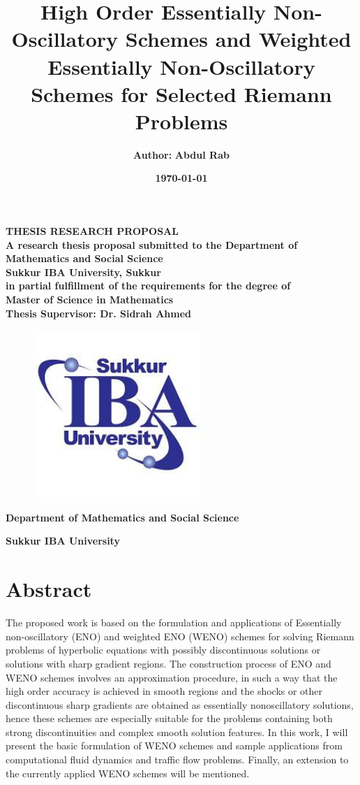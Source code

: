 \documentclass{article}
\title{\textbf{High Order Essentially Non-Oscillatory Schemes and Weighted Essentially Non-Oscillatory Schemes for Selected Riemann Problems}}
\author{\textbf {Author: }\textbf{Abdul Rab}}
\date{\textbf \today}
\begin{document}
\maketitle
\begin{center}
    \textbf{THESIS RESEARCH PROPOSAL \\A research thesis proposal submitted to the Department of\\ Mathematics and Social Science\\Sukkur IBA University, Sukkur\\ \medskip in partial fulfillment of the requirements for the degree of\\Master of Science in Mathematics\\ \medskip Thesis Supervisor: Dr. Sidrah Ahmed}
\end{center} 

\begin{figure}[h]
    \centering
    \includegraphics[height = 2.5in]{IBA.jpg}
    \label{fig:my_label}
\end{figure}
\begin{center}
    \textbf {Department of Mathematics and Social Science}
\end{center}

\begin{center}
    \Huge{\textbf{Sukkur IBA University}}
\end{center}
\newpage

\tableofcontents

\section*{\textbf{Abstract}}
The proposed work is based on the formulation and applications of Essentially
non-oscillatory (ENO) and weighted ENO (WENO) schemes for solving
Riemann problems of hyperbolic equations with possibly discontinuous
solutions or solutions with sharp gradient regions. The construction process of
ENO and WENO schemes \cite{shu_2020} involves an approximation procedure, in such a way
that the high order accuracy is achieved in smooth regions and the shocks or
other discontinuous sharp gradients are obtained as essentially nonoscillatory solutions, hence these schemes are especially suitable for the
problems containing both strong discontinuities and complex smooth solution
features. In this work, I will present the basic formulation of WENO schemes
and sample applications from computational fluid dynamics and traffic flow
problems. Finally, an extension to the currently applied WENO schemes will
be mentioned.
\end{document}
